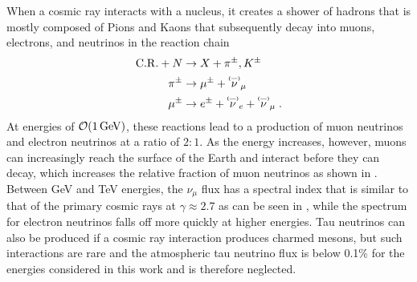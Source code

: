 When a cosmic ray interacts with a nucleus, it creates a shower of hadrons that is mostly composed of Pions and Kaons that subsequently decay into muons, electrons, and neutrinos in the reaction chain
\begin{equation}
    \begin{aligned}
        \mathrm{C.R.} + N & \rightarrow X + \pi^\pm, K^\pm \\
        \pi^\pm & \rightarrow \mu^\pm + \pbar{\nu}_\mu \\
        \mu^\pm & \rightarrow e^\pm + \pbar{\nu}_e + \pbar{\nu}_\mu\;.
    \end{aligned}
\end{equation}
At energies of $\order{\SI{1}{GeV}}$, these reactions lead to a production of muon neutrinos and electron neutrinos at a ratio of $2:1$. As the energy increases, however, muons can increasingly reach the surface of the Earth and interact before they can decay, which increases the relative fraction of muon neutrinos as shown in . Between GeV and TeV energies, the $\nu_\mu$ flux has a spectral index that is similar to that of the primary cosmic rays at $\gamma \approx 2.7$ as can be seen in , while the spectrum for electron neutrinos falls off more quickly at higher energies. Tau neutrinos can also be produced if a cosmic ray interaction produces charmed mesons, but such interactions are rare and the atmospheric tau neutrino flux is below 0.1\% for the energies considered in this work\cite{fedynitch2015calculation} and is therefore neglected.
